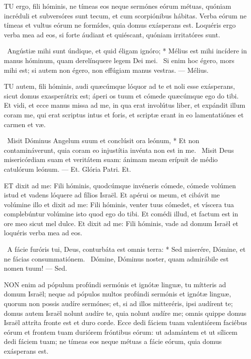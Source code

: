 
\lettrine[lines=2]{T}{U} ergo, fili hóminis, ne tímeas eos neque sermónes eórum métuas, quóniam incréduli et subversóres sunt tecum, et cum scorpiónibus hábitas. Verba eórum ne tímeas et vultus eórum ne formídes, quia domus exásperans est. Loquéris ergo verba mea ad eos, si forte áudiant et quiéscant, quóniam irritatóres sunt.

\R\ Angústiæ mihi sunt úndique, et quid éligam ignóro; * Mélius est mihi incídere in manus hóminum, quam derelínquere legem Dei mei. \V\ Si enim hoc égero, mors mihi est; si autem non égero, non effúgiam manus vestras. — Mélius.



\lettrine[lines=2]{T}{U} autem, fili hóminis, audi quæcúmque lóquor ad te et noli esse exásperans, sicut domus exasperátrix est; áperi os tuum et cómede quæcúmque ego do tibi. Et vidi, et ecce manus missa ad me, in qua erat involútus liber, et expándit illum coram me, qui erat scriptus intus et foris, et scriptæ erant in eo lamentatiónes et carmen et væ.

\R\ Misit Dóminus Angelum suum et conclúsit ora leónum, * Et non contamináverunt, quia coram eo injustítia invénta non est in me. \V\ Misit Deus misericórdiam suam et veritátem suam: ánimam meam erípuit de médio catulórum leónum. — Et. Glória Patri. Et.




\lettrine[lines=2]{E}{T} dixit ad me: Fili hóminis, quodcúmque invéneris cómede, cómede volúmen istud et vadens lóquere ad fílios Israël. Et apérui os meum, et cibávit me volúmine illo et dixit ad me: Fili hóminis, venter tuus cómedet, et víscera tua complebúntur volúmine isto quod ego do tibi. Et comédi illud, et factum est in ore meo sicut mel dulce. Et dixit ad me: Fili hóminis, vade ad domum Israël et loquéris verba mea ad eos.

\R\ A fácie furóris tui, Deus, conturbáta est omnis terra: * Sed miserére, Dómine, et ne fácias consummatiónem. \V\ Dómine, Dóminus noster, quam admirábile est nomen tuum! — Sed.


\lettrine[lines=2]{N}{ON} enim ad pópulum profúndi sermónis et ignótæ linguæ, tu mítteris ad domum Israël; neque ad pópulos multos profúndi sermónis et ignótæ linguæ, quorum non possis audíre sermónes; et, si ad illos mitteréris, ipsi audírent te; domus autem Israël nolunt audíre te, quia nolunt audíre me; omnis quippe domus Israël attríta fronte est et duro corde. Ecce dedi fáciem tuam valentiórem faciébus eórum et frontem tuam duriórem fróntibus eórum: ut adamántem et ut sílicem dedi fáciem tuam; ne tímeas eos neque métuas a fácie eórum, quia domus exásperans est.

